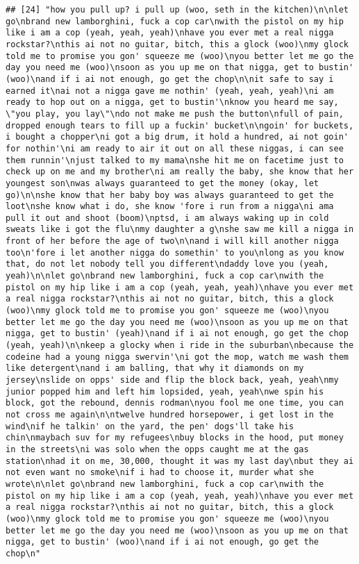 \documentclass[]{article}
\begin{document}
\begin{verbatim}
## [24] "how you pull up? i pull up (woo, seth in the kitchen)\n\nlet go\nbrand new lamborghini, fuck a cop car\nwith the pistol on my hip like i am a cop (yeah, yeah, yeah)\nhave you ever met a real nigga rockstar?\nthis ai not no guitar, bitch, this a glock (woo)\nmy glock told me to promise you gon' squeeze me (woo)\nyou better let me go the day you need me (woo)\nsoon as you up me on that nigga, get to bustin' (woo)\nand if i ai not enough, go get the chop\n\nit safe to say i earned it\nai not a nigga gave me nothin' (yeah, yeah, yeah)\ni am ready to hop out on a nigga, get to bustin'\nknow you heard me say, \"you play, you lay\"\ndo not make me push the button\nfull of pain, dropped enough tears to fill up a fuckin' bucket\n\ngoin' for buckets, i bought a chopper\ni got a big drum, it hold a hundred, ai not goin' for nothin'\ni am ready to air it out on all these niggas, i can see them runnin'\njust talked to my mama\nshe hit me on facetime just to check up on me and my brother\ni am really the baby, she know that her youngest son\nwas always guaranteed to get the money (okay, let go)\n\nshe know that her baby boy was always guaranteed to get the loot\nshe know what i do, she know 'fore i run from a nigga\ni ama pull it out and shoot (boom)\nptsd, i am always waking up in cold sweats like i got the flu\nmy daughter a g\nshe saw me kill a nigga in front of her before the age of two\n\nand i will kill another nigga too\n'fore i let another nigga do somethin' to you\nlong as you know that, do not let nobody tell you different\ndaddy love you (yeah, yeah)\n\nlet go\nbrand new lamborghini, fuck a cop car\nwith the pistol on my hip like i am a cop (yeah, yeah, yeah)\nhave you ever met a real nigga rockstar?\nthis ai not no guitar, bitch, this a glock (woo)\nmy glock told me to promise you gon' squeeze me (woo)\nyou better let me go the day you need me (woo)\nsoon as you up me on that nigga, get to bustin' (yeah)\nand if i ai not enough, go get the chop (yeah, yeah)\n\nkeep a glocky when i ride in the suburban\nbecause the codeine had a young nigga swervin'\ni got the mop, watch me wash them like detergent\nand i am balling, that why it diamonds on my jersey\nslide on opps' side and flip the block back, yeah, yeah\nmy junior popped him and left him lopsided, yeah, yeah\nwe spin his block, got the rebound, dennis rodman\nyou fool me one time, you can not cross me again\n\ntwelve hundred horsepower, i get lost in the wind\nif he talkin' on the yard, the pen' dogs'll take his chin\nmaybach suv for my refugees\nbuy blocks in the hood, put money in the streets\ni was solo when the opps caught me at the gas station\nhad it on me, 30,000, thought it was my last day\nbut they ai not even want no smoke\nif i had to choose it, murder what she wrote\n\nlet go\nbrand new lamborghini, fuck a cop car\nwith the pistol on my hip like i am a cop (yeah, yeah, yeah)\nhave you ever met a real nigga rockstar?\nthis ai not no guitar, bitch, this a glock (woo)\nmy glock told me to promise you gon' squeeze me (woo)\nyou better let me go the day you need me (woo)\nsoon as you up me on that nigga, get to bustin' (woo)\nand if i ai not enough, go get the chop\n"                                                                                                                                
\end{verbatim}
\end{document}
